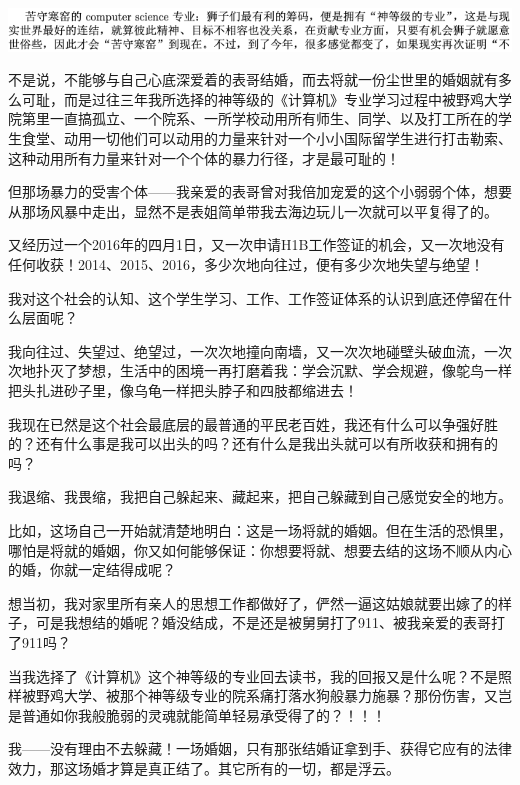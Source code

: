 \documentclass[9pt, b5paper]{article}
\begin{document}
\begin{center}
\includegraphics[width=.9\linewidth]{./pic/backups_plans_20210427_120126.png}
\end{center}

不是说，不能够与自己心底深爱着的表哥结婚，而去将就一份尘世里的婚姻就有多么可耻，而是过往三年我所选择的神等级的《计算机》专业学习过程中被野鸡大学院第里一直搞孤立、一个院系、一所学校动用所有师生、同学、以及打工所在的学生食堂、动用一切他们可以动用的力量来针对一个小小国际留学生进行打击勒索、这种动用所有力量来针对一个个体的暴力行径，才是最可耻的！

但那场暴力的受害个体——我亲爱的表哥曾对我倍加宠爱的这个小弱弱个体，想要从那场风暴中走出，显然不是表姐简单带我去海边玩儿一次就可以平复得了的。

又经历过一个2016年的四月1日，又一次申请H1B工作签证的机会，又一次地没有任何收获！2014、2015、2016，多少次地向往过，便有多少次地失望与绝望！

我对这个社会的认知、这个学生学习、工作、工作签证体系的认识到底还停留在什么层面呢？

我向往过、失望过、绝望过，一次次地撞向南墙，又一次次地碰壁头破血流，一次次地扑灭了梦想，生活中的困境一再打磨着我：学会沉默、学会规避，像鸵鸟一样把头扎进砂子里，像乌龟一样把头脖子和四肢都缩进去！

我现在已然是这个社会最底层的最普通的平民老百姓，我还有什么可以争强好胜的？还有什么事是我可以出头的吗？还有什么是我出头就可以有所收获和拥有的吗？

我退缩、我畏缩，我把自己躲起来、藏起来，把自己躲藏到自己感觉安全的地方。

比如，这场自己一开始就清楚地明白：这是一场将就的婚姻。但在生活的恐惧里，哪怕是将就的婚姻，你又如何能够保证：你想要将就、想要去结的这场不顺从内心的婚，你就一定结得成呢？

想当初，我对家里所有亲人的思想工作都做好了，俨然一逼这姑娘就要出嫁了的样子，可是我想结的婚呢？婚没结成，不是还是被舅舅打了911、被我亲爱的表哥打了911吗？

当我选择了《计算机》这个神等级的专业回去读书，我的回报又是什么呢？不是照样被野鸡大学、被那个神等级专业的院系痛打落水狗般暴力施暴？那份伤害，又岂是普通如你我般脆弱的灵魂就能简单轻易承受得了的？！！！

我——没有理由不去躲藏！一场婚姻，只有那张结婚证拿到手、获得它应有的法律效力，那这场婚才算是真正结了。其它所有的一切，都是浮云。
\end{document}

